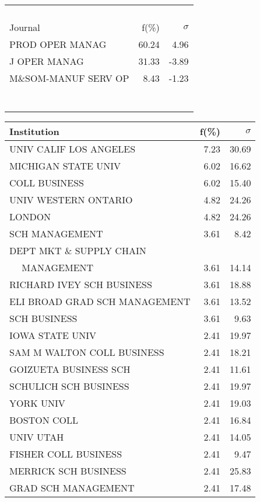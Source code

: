 \documentclass[a4paper,11pt]{report}
\begin{document}
\begin{landscape}
\begin{table}[!ht]
{\begin{tabular}{|l r  r|}
 &  & \\
 &  & \\
 &  & \\
 &  & \\
\hline
\hline
Journal & f(\%) & $\sigma$\\
\hline
PROD OPER MANAG & 60.24 & 4.96\\
J OPER MANAG & 31.33 & -3.89\\
M\&SOM-MANUF SERV OP & 8.43 & -1.23\\
 &  & \\
 &  & \\
 &  & \\
 &  & \\
 &  & \\
 &  & \\
 &  & \\
\hline
\end{tabular}
}
{\scriptsize\begin{tabular}{|l r r|}
\hline
Institution & f(\%) & $\sigma$\\
\hline
UNIV CALIF LOS ANGELES & 7.23 & 30.69\\
MICHIGAN STATE UNIV & 6.02 & 16.62\\
COLL BUSINESS & 6.02 & 15.40\\
UNIV WESTERN ONTARIO & 4.82 & 24.26\\
LONDON & 4.82 & 24.26\\
SCH MANAGEMENT & 3.61 & 8.42\\
DEPT MKT \& SUPPLY CHAIN &  & \\
$\quad$ MANAGEMENT & 3.61 & 14.14\\
RICHARD IVEY SCH BUSINESS & 3.61 & 18.88\\
ELI BROAD GRAD SCH MANAGEMENT & 3.61 & 13.52\\
SCH BUSINESS & 3.61 & 9.63\\
IOWA STATE UNIV & 2.41 & 19.97\\
SAM M WALTON COLL BUSINESS & 2.41 & 18.21\\
GOIZUETA BUSINESS SCH & 2.41 & 11.61\\
SCHULICH SCH BUSINESS & 2.41 & 19.97\\
YORK UNIV & 2.41 & 19.03\\
BOSTON COLL & 2.41 & 16.84\\
UNIV UTAH & 2.41 & 14.05\\
FISHER COLL BUSINESS & 2.41 & 9.47\\
MERRICK SCH BUSINESS & 2.41 & 25.83\\
GRAD SCH MANAGEMENT & 2.41 & 17.48\\

\end{tabular}}
\end{table}
\end{landscape}
\end{document}
